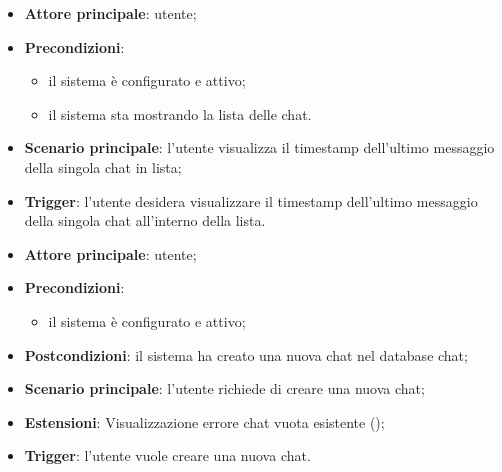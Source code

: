 \documentclass[10pt, a4paper]{article}
\begin{document}
    \begin{itemize}
        \item \textbf{Attore principale}: utente;
        \item \textbf{Precondizioni}:
            \begin{itemize}
                \item il sistema è configurato e attivo;
                \item il sistema sta mostrando la lista delle chat.
            \end{itemize}
        \item \textbf{Scenario principale}: l'utente visualizza il timestamp dell'ultimo messaggio della singola chat in lista;
        \item \textbf{Trigger}: l’utente desidera visualizzare il timestamp dell'ultimo messaggio della singola chat all’interno della lista.
    \end{itemize}

    \begin{itemize}
        \item \textbf{Attore principale}: utente;
        \item \textbf{Precondizioni}:
        \begin{itemize}
            \item il sistema è configurato e attivo;
        \end{itemize}
        \item \textbf{Postcondizioni}: il sistema ha creato una nuova chat nel database chat;
        \item \textbf{Scenario principale}: l’utente richiede di creare una nuova chat;
        \item \textbf{Estensioni}: Visualizzazione errore chat vuota esistente ();
        \item \textbf{Trigger}: l’utente vuole creare una nuova chat.
    \end{itemize}
\end{document}
